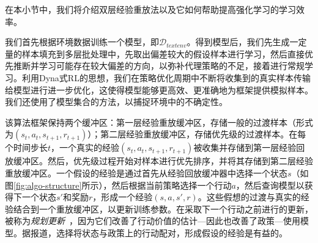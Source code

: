 
在本小节中，我们将介绍双层经验重放法以及它如何帮助提高强化学习的学习效率。

我们首先根据环境数据训练一个模型，即$\mathcal{D}_{text{env}}$。得到模型后，我们先生成一定量的样本填充到多层批处理中，先取出偏差较大的假设样本进行学习，然后直接优先推断并学习可能存在较大偏差的方向，以弥补代理策略的不足，接着进行常规学习。利用Dyna式RL的思想，我们在策略优化周期中不断将收集到的真实样本传输给模型进行进一步优化，这使得模型能够更高效、更准确地为框架提供模拟样本。我们还使用了模型集合的方法，以捕捉环境中的不确定性。

该算法框架保持两个缓冲区：第一层经验重放缓冲区，存储一般的过渡样本（形式为$(s_t, a_t, s_{t+1}, r_{t+1})$）；第二层经验重放缓冲区，存储优先级的过渡样本。在每个时间步长$t$，一个真实的经验$(s_t, a_t, s_{t+1}, r_{t+1})$被收集并存储到第一层经验回放缓冲区。然后，优先级过程开始对样本进行优先排序，并将其存储到第二层经验重放缓冲区。一个假设的经验是通过首先从经验回放缓冲器中选择一个状态$s$（如图\ref{fig:algo-structure}所示），然后根据当前策略选择一个行动$a$，然后查询模型以获得下一个状态$s'$和奖励$r$，形成一个经验$(s, a, s', r)$。这些假想的过渡与真实的经验结合到一个重放缓冲区，以更新训练参数。在采取下一个行动之前进行的更新，被称为\emph{规划更新}~\cite{sutton2018intro}，因为它们改善了行动价值的估计---因此也改善了政策---使用模型。据报道，选择将状态与政策上的行动配对，形成假设的经验是有益的\cite{gu2016continuous,yangchen2018rem,janner2019trustmodel}。

